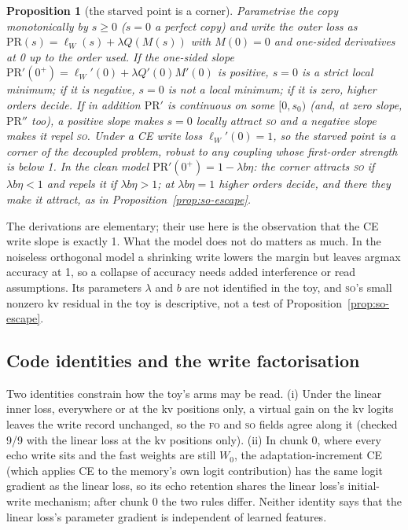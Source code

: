 \documentclass[11pt]{article}
\newtheorem{proposition}{Proposition}
\newcommand{\FO}{\textsc{fo}}
\newcommand{\SO}{\textsc{so}}
\begin{document}
\begin{proposition}[the starved point is a corner]
\label{prop:corner}
Parametrise the copy monotonically by $s\ge0$ ($s=0$ a perfect copy) and write the outer loss as
$\mathrm{PR}(s)=\ell_W(s)+\lambda Q(M(s))$ with $M(0)=0$ and one-sided derivatives at 0 up to the
order used. If the one-sided slope $\mathrm{PR}'(0^+)=\ell_W'(0)+\lambda Q'(0)M'(0)$ is positive,
$s=0$ is a strict local minimum; if it is negative, $s=0$ is not a local minimum; if it is zero,
higher orders decide. If in addition $\mathrm{PR}'$ is continuous on some $[0,s_0)$ (and, at zero
slope, $\mathrm{PR}''$ too), a positive slope makes $s=0$ locally attract \SO{} and a negative slope
makes it repel \SO. Under a CE write loss $\ell_W'(0)=1$, so the starved point is a corner of the
decoupled problem, robust to any coupling whose first-order strength is below 1. In the clean model
$\mathrm{PR}'(0^+)=1-\lambda b\eta$: the corner attracts \SO{} if $\lambda b\eta<1$ and repels it if
$\lambda b\eta>1$; at $\lambda b\eta=1$ higher orders decide, and there they make it attract, as in
Proposition~\ref{prop:so-escape}.
\end{proposition}

The derivations are elementary; their use here is the observation that the CE write slope is exactly
1. What the model does not do matters as much. In the noiseless orthogonal model a shrinking write
lowers the margin but leaves argmax accuracy at 1, so a collapse of accuracy needs added interference
or read assumptions. Its parameters $\lambda$ and $b$ are not identified in the toy, and \SO's small
nonzero kv residual in the toy is descriptive, not a test of Proposition~\ref{prop:so-escape}.

\subsection{Code identities and the write factorisation}

Two identities constrain how the toy's arms may be read. (i) Under the linear inner loss, everywhere
or at the kv positions only, a virtual gain on the kv logits leaves the write record unchanged, so the
\FO{} and \SO{} fields agree along it (checked 9/9 with the linear loss at the kv positions only).
(ii) In chunk 0, where every echo write sits and the fast weights are still $W_0$, the
adaptation-increment CE (which applies CE to the memory's own logit contribution) has the same logit
gradient as the linear loss, so its echo retention shares the linear loss's initial-write mechanism;
after chunk 0 the two rules differ.
Neither identity says that the linear loss's parameter gradient is independent of learned features.
\end{document}
